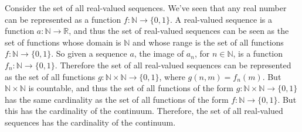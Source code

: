             \begin{lexample}
                Consider the set of all real-valued sequences. We've seen
                that any real number can be represented as a function
                $f:\mathbb{N}\rightarrow\{0,1\}$. A real-valued sequence
                is a function $a:\mathbb{N}\rightarrow\mathbb{R}$, and
                thus the set of real-valued sequences can be seen as the
                set of functions whose domain is $\mathbb{N}$ and whose
                range is the set of all functions
                $f:\mathbb{N}\rightarrow\{0,1\}$. So given a sequence
                $a$, the image of $a_{n}$, for $n\in\mathbb{N}$, is a
                function $f_{n}:\mathbb{N}\rightarrow\{0,1\}$. Therefore
                the set of all real-valued sequences can be represented
                as the set of all functions
                $g:\mathbb{N}\times\mathbb{N}\rightarrow\{0,1\}$, where
                $g(n,m)=f_{n}(m)$. But $\mathbb{N}\times\mathbb{N}$ is
                countable, and thus the set of all functions of the form
                $g:\mathbb{N}\times\mathbb{N}\rightarrow\{0,1\}$ has the
                same cardinality as the set of all functions of the form
                $f:\mathbb{N}\rightarrow\{0,1\}$. But this has the
                cardinality of the continuum. Therefore, the set of all
                real-valued sequences has the cardinality of the continuum.
            \end{lexample}
